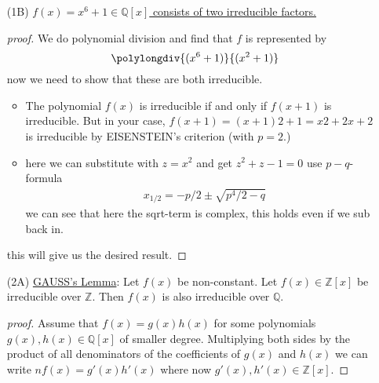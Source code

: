 \documentclass[]{scrartcl}
\newcommand{\Z}{\mathbb{Z}}
\newcommand{\Q}{\mathbb{Q}}
\newcommand{\<}{\trianglelefteq}
\begin{document}
\begin{itemize}
\begin{proof}[proof]
		Let $ K $ be a field and let $ f(x) \in K[x] $ be a nonconstant polynomial. Then the following conditions are equivalent. 
	\end{proof}
	\item[(1B)] \underline{$f(x) = x^6 +1 \in \Q[x]$ consists of two irreducible factors.}
	\begin{proof}[proof]
		We do polynomial division and find that $f$ is represented by 
		\[
			\polylongdiv{(x^6+1)}{(x^2+1)}
		\]
		now we need to show that these are both irreducible.
		\begin{itemize}
			\item The polynomial $f(x)$ is irreducible if and only if $f(x+1)$ is irreducible. But in your case,
			$f(x+1)=(x+1)2+1=x2+2x+2$
			is irreducible by EISENSTEIN's criterion (with $p=2$.)
			\item here we can substitute with $z = x^2$ and get $z^2+z-1 = 0$ use $p-q$-formula
			\begin{align*}
				x_{1/2} = - p/2 \pm \sqrt{p^4/2 - q}
			\end{align*}
			we can see that here the sqrt-term is complex, this holds even if we sub back in.
		\end{itemize}
		this will give us the desired result.
	\end{proof}
	\item[(2A)] \underline{GAUSS's Lemma}: %
		Let $ f(x) $ be non-constant. Let  $f(x) \in \Z[x] $ be irreducible over $ \Z $. Then $ f(x) $ is also irreducible over $ \Q $. 
	\begin{proof}[proof]
		Assume that $ f(x) = g(x) h(x) $ for some polynomials $ g(x), h(x) \in \mathbb{Q}[x] $ of smaller degree. 
		Multiplying both sides by the product of all denominators of the coefficients of $ g(x) $ and $ h(x) $ we can write 
		$ n f(x) = g'(x) h'(x) $ where now 
		$ g'(x), h'(x) \in \Z[x] $.
		

\end{proof}
\end{itemize}
\end{document}
